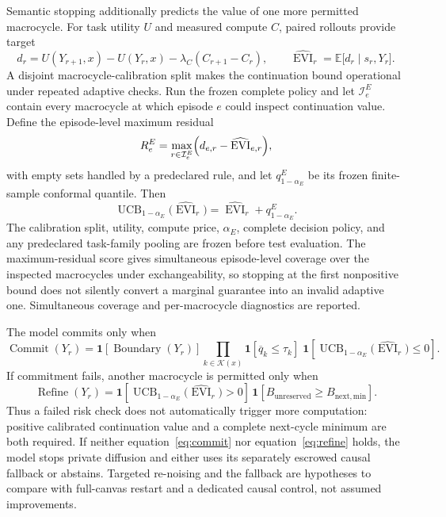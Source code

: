 \documentclass[10pt,a4paper]{article}
\newcommand{\op}[1]{\operatorname{#1}}
\newcommand{\ind}[1]{\mathbf{1}\!\left[#1\right]}
\newcommand{\Kcal}{\mathcal{K}}
\newcommand{\Ical}{\mathcal{I}}
\newcommand{\E}{\mathbb{E}}
\begin{document}
Semantic stopping additionally predicts the value of one more permitted
macrocycle. For task utility $U$ and measured compute $C$, paired rollouts
provide target
\begin{equation}
d_r = U(Y_{r+1}, x) - U(Y_r, x) - \lambda_C ( C_{r+1} - C_r ),
\qquad
\widehat{\op{EVI}}_r = \E\bigl[ d_r \mid s_r, Y_r \bigr].
\end{equation}
A disjoint macrocycle-calibration split makes the continuation bound
operational under repeated adaptive checks. Run the frozen complete policy and
let $\Ical^E_e$ contain every macrocycle at which episode $e$ could inspect
continuation value. Define the episode-level maximum residual
\begin{equation}
R^E_e = \max_{r \in \Ical^E_e}
  \Bigl( d_{e,r} - \widehat{\op{EVI}}_{e,r} \Bigr),
\end{equation}
with empty sets handled by a predeclared rule, and let $q^E_{1-\alpha_E}$ be
its frozen finite-sample conformal quantile. Then
\begin{equation}
\op{UCB}_{1-\alpha_E}\bigl( \widehat{\op{EVI}}_r \bigr)
= \widehat{\op{EVI}}_r + q^E_{1-\alpha_E} .
\end{equation}
The calibration split, utility, compute price, $\alpha_E$, complete decision
policy, and any predeclared task-family pooling are frozen before test
evaluation. The maximum-residual score gives simultaneous episode-level
coverage over the inspected macrocycles under exchangeability, so stopping at
the first nonpositive bound does not silently convert a marginal guarantee
into an invalid adaptive one. Simultaneous coverage and per-macrocycle
diagnostics are reported.

The model commits only when
\begin{equation}
\op{Commit}(Y_r) = \ind{\op{Boundary}(Y_r)}
\prod_{k \in \Kcal(x)} \ind{\overline{q}_k \le \tau_k}\;
\ind{\op{UCB}_{1-\alpha_E}\bigl( \widehat{\op{EVI}}_r \bigr) \le 0}.
\label{eq:commit}
\end{equation}
If commitment fails, another macrocycle is permitted only when
\begin{equation}
\op{Refine}(Y_r) = \ind{\op{UCB}_{1-\alpha_E}\bigl( \widehat{\op{EVI}}_r \bigr) > 0}\,
\ind{B_{\mathrm{unreserved}} \ge B_{\mathrm{next,min}}}.
\label{eq:refine}
\end{equation}
Thus a failed risk check does not automatically trigger more computation:
positive calibrated continuation value and a complete next-cycle minimum are
both required. If neither equation~\eqref{eq:commit} nor
equation~\eqref{eq:refine} holds, the model stops private diffusion and either
uses its separately escrowed causal fallback or abstains. Targeted re-noising
and the fallback are hypotheses to compare with full-canvas restart and a
dedicated causal control, not assumed improvements.
\end{document}
